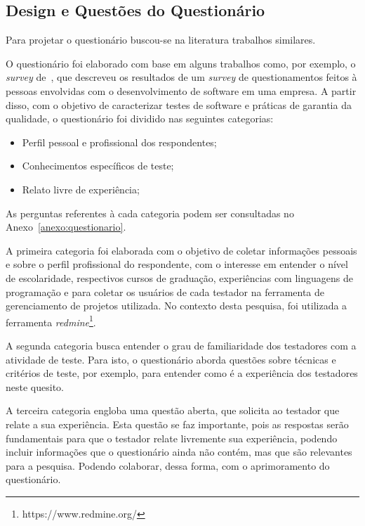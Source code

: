 \subsection{Design e Questões do Questionário}
\label{sec:desingquestions}

Para projetar o questionário buscou-se na literatura trabalhos similares.

O questionário foi elaborado com base em alguns trabalhos como, por exemplo, o \textit{survey} de~\cite{geras2004survey}, que descreveu os resultados de um \textit{survey} de questionamentos feitos à pessoas envolvidas com o desenvolvimento de software em uma empresa. A partir disso, com o objetivo de caracterizar testes de software e práticas de garantia da qualidade, o questionário foi dividido nas seguintes categorias:

\begin{itemize}
\item  Perfil pessoal e profissional dos respondentes;
\item  Conhecimentos específicos de teste;
\item  Relato livre de experiência;
\end{itemize}

As perguntas referentes à cada categoria podem ser consultadas no Anexo~\ref{anexo:questionario}.

A primeira categoria foi elaborada com o objetivo de coletar informações pessoais e sobre o perfil profissional do respondente, com o interesse em entender o nível de escolaridade, respectivos cursos de graduação, experiências com linguagens de programação e para coletar os usuários de cada testador na ferramenta de gerenciamento de projetos utilizada. No contexto desta pesquisa, foi utilizada a ferramenta \textit{redmine}\footnote{https://www.redmine.org/}.

A segunda categoria busca entender o grau de familiaridade dos testadores com a atividade de teste. Para isto, o questionário aborda questões sobre técnicas e critérios de teste, por exemplo, para entender como é a experiência dos testadores neste quesito.

A terceira categoria engloba uma questão aberta, que solicita ao testador que relate a sua experiência. Esta questão se faz importante, pois as respostas serão fundamentais para que o testador relate livremente sua experiência, podendo incluir informações que o questionário ainda não contém, mas que são relevantes para a pesquisa. Podendo colaborar, dessa forma, com o aprimoramento do questionário.

